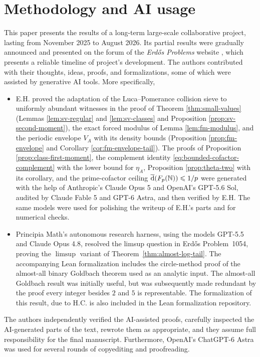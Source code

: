 \documentclass[11pt,letterpaper,reqno]{amsart}
\numberwithin{equation}{section}
\theoremstyle{remark}
\newcommand{\N}{\mathbb{N}}
\newcommand{\1}{\mathbf 1}
\newcommand{\upperdens}{\overline{\textup{d}}}
\renewcommand{\leq}{\leqslant}
\begin{document}
\section*{Methodology and AI usage}
This paper presents the results of a long-term large-scale collaborative project, lasting from November 2025 to August 2026. Its partial results were gradually announced and presented on the forum of the \emph{Erd\H{o}s Problems} website \cite{Bloom1054}, which presents a reliable timeline of project's development. The authors contributed with their thoughts, ideas, proofs, and formalizations, some of which were assisted by generative AI tools. More specifically,
\begin{itemize}
\item E.H. proved the adaptation of the Luca--Pomerance collision sieve to uniformly abundant witnesses in the proof of Theorem \ref{thm:small-values} (Lemmas \ref{lem:sv-regular} and \ref{lem:sv-classes} and Proposition \ref{prop:sv-second-moment}), the exact forced modulus of Lemma \ref{lem:fm-modulus}, and the periodic envelope $V_A$ with its density bounds (Proposition \ref{prop:fm-envelope} and Corollary \ref{cor:fm-envelope-tail}). The proofs of Proposition \ref{prop:class-first-moment}, the complement identity \eqref{eq:bounded-cofactor-complement} with the lower bound for $\eta_A$, Proposition \ref{prop:theta-two} with its corollary, and the prime-cofactor ceiling $\upperdens(F_p(\N))\leq1/p$ were generated with the help of Anthropic's Claude Opus 5 and OpenAI's GPT-5.6 Sol, audited by Claude Fable 5 and GPT-6 Astra, and then verified by E.H. The same models were used for polishing the writeup of E.H.'s parts and for numerical checks.

\item Principia Math's autonomous research harness, using the models GPT-5.5 and
Claude Opus 4.8, resolved the limsup question in Erd\H{o}s Problem~1054,
proving the $\limsup$ variant of Theorem~\ref{thm:almost-log-tail}. The accompanying Lean
formalization includes the circle-method proof of the almost-all
binary Goldbach theorem used as an analytic input. The almost-all Goldbach result was initially useful, but was subsequently made redundant by the proof every integer besides $2$ and $5$ is representable. The formalization of this result, due to H.C. is also included in the Lean formalization repository.
\end{itemize}
The authors independently verified the AI-assisted proofs, carefully inspected the AI-generated parts of the text, rewrote them as appropriate, and they assume full responsibility for the final manuscript. Furthermore, OpenAI's ChatGPT-6 Astra was used for several rounds of copyediting and proofreading.
\end{document}
